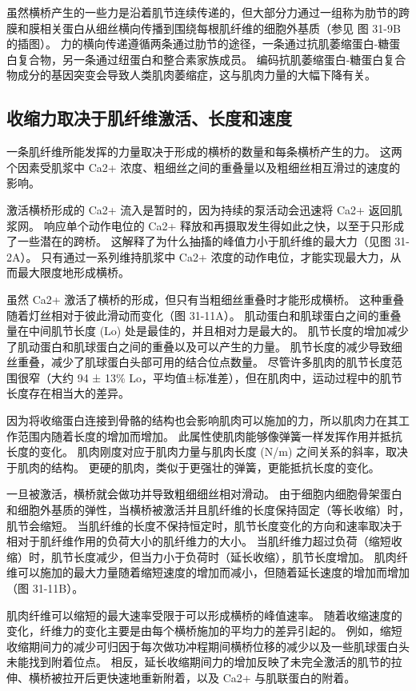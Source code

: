 虽然横桥产生的一些力是沿着肌节连续传递的，但大部分力通过一组称为肋节的跨膜和膜相关蛋白从细丝横向传播到围绕每根肌纤维的细胞外基质（参见 图 31-9B 的插图）。 力的横向传递遵循两条通过肋节的途径，一条通过抗肌萎缩蛋白-糖蛋白复合物，另一条通过纽蛋白和整合素家族成员。 编码抗肌萎缩蛋白-糖蛋白复合物成分的基因突变会导致人类肌肉萎缩症，这与肌肉力量的大幅下降有关。

\subsection{收缩力取决于肌纤维激活、长度和速度}
一条肌纤维所能发挥的力量取决于形成的横桥的数量和每条横桥产生的力。 这两个因素受肌浆中 Ca2+ 浓度、粗细丝之间的重叠量以及粗细丝相互滑过的速度的影响。

激活横桥形成的 Ca2+ 流入是暂时的，因为持续的泵活动会迅速将 Ca2+ 返回肌浆网。 响应单个动作电位的 Ca2+ 释放和再摄取发生得如此之快，以至于只形成了一些潜在的跨桥。 这解释了为什么抽搐的峰值力小于肌纤维的最大力（见图 31-2A）。 只有通过一系列维持肌浆中 Ca2+ 浓度的动作电位，才能实现最大力，从而最大限度地形成横桥。

虽然 Ca2+ 激活了横桥的形成，但只有当粗细丝重叠时才能形成横桥。 这种重叠随着灯丝相对于彼此滑动而变化（图 31-11A）。 肌动蛋白和肌球蛋白之间的重叠量在中间肌节长度 (Lo) 处是最佳的，并且相对力是最大的。 肌节长度的增加减少了肌动蛋白和肌球蛋白之间的重叠以及可以产生的力量。 肌节长度的减少导致细丝重叠，减少了肌球蛋白头部可用的结合位点数量。 尽管许多肌肉的肌节长度范围很窄（大约 94 ± 13\% Lo，平均值±标准差），但在肌肉中，运动过程中的肌节长度存在相当大的差异。

因为将收缩蛋白连接到骨骼的结构也会影响肌肉可以施加的力，所以肌肉力在其工作范围内随着长度的增加而增加。 此属性使肌肉能够像弹簧一样发挥作用并抵抗长度的变化。 肌肉刚度对应于肌肉力量与肌肉长度 (N/m) 之间关系的斜率，取决于肌肉的结构。 更硬的肌肉，类似于更强壮的弹簧，更能抵抗长度的变化。

一旦被激活，横桥就会做功并导致粗细细丝相对滑动。 由于细胞内细胞骨架蛋白和细胞外基质的弹性，当横桥被激活并且肌纤维的长度保持固定（等长收缩）时，肌节会缩短。 当肌纤维的长度不保持恒定时，肌节长度变化的方向和速率取决于相对于肌纤维作用的负荷大小的肌纤维力的大小。 当肌纤维力超过负荷（缩短收缩）时，肌节长度减少，但当力小于负荷时（延长收缩），肌节长度增加。 肌肉纤维可以施加的最大力量随着缩短速度的增加而减小，但随着延长速度的增加而增加（图 31-11B）。

肌肉纤维可以缩短的最大速率受限于可以形成横桥的峰值速率。 随着收缩速度的变化，纤维力的变化主要是由每个横桥施加的平均力的差异引起的。 例如，缩短收缩期间力的减少可归因于每次做功冲程期间横桥位移的减少以及一些肌球蛋白头未能找到附着位点。 相反，延长收缩期间力的增加反映了未完全激活的肌节的拉伸、横桥被拉开后更快速地重新附着，以及 Ca2+ 与肌联蛋白的附着。

